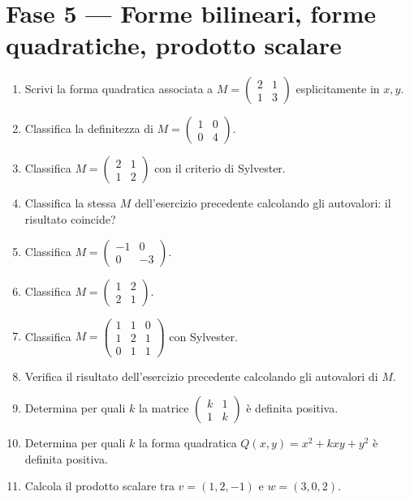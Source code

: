 \documentclass[a4paper,11pt]{article}
\begin{document}
\section{Fase 5 --- Forme bilineari, forme quadratiche, prodotto scalare}
\begin{enumerate}
  \item Scrivi la forma quadratica associata a $M=\begin{pmatrix}2&1\\1&3\end{pmatrix}$ esplicitamente in $x,y$.
  \item Classifica la definitezza di $M=\begin{pmatrix}1&0\\0&4\end{pmatrix}$.
  \item Classifica $M=\begin{pmatrix}2&1\\1&2\end{pmatrix}$ con il criterio di Sylvester.
  \item Classifica la stessa $M$ dell'esercizio precedente calcolando gli autovalori: il risultato coincide?
  \item Classifica $M=\begin{pmatrix}-1&0\\0&-3\end{pmatrix}$.
  \item Classifica $M=\begin{pmatrix}1&2\\2&1\end{pmatrix}$.
  \item Classifica $M=\begin{pmatrix}1&1&0\\1&2&1\\0&1&1\end{pmatrix}$ con Sylvester.
  \item Verifica il risultato dell'esercizio precedente calcolando gli autovalori di $M$.
  \item Determina per quali $k$ la matrice $\begin{pmatrix}k&1\\1&k\end{pmatrix}$ è definita positiva.
  \item Determina per quali $k$ la forma quadratica $Q(x,y)=x^2+kxy+y^2$ è definita positiva.
  \item Calcola il prodotto scalare tra $v=(1,2,-1)$ e $w=(3,0,2)$.

\end{enumerate}
\end{document}
